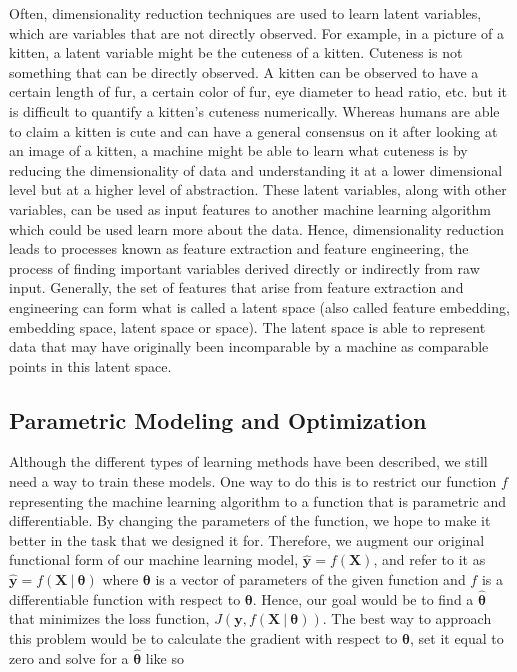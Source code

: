 Often, dimensionality reduction techniques are used to learn latent variables, which  are variables that are not directly observed. For example, in a picture of a kitten, a latent variable might be the cuteness of a kitten. Cuteness is not something that can be directly observed. A kitten can be observed to have a certain length of fur, a certain color of fur, eye diameter to head ratio, etc. but it is difficult to quantify a kitten's cuteness numerically. Whereas humans are able to claim a kitten is cute and can have a general consensus on it after looking at an image of a kitten, a machine might be able to learn what cuteness is by reducing the dimensionality of data and understanding it at a lower dimensional level but at a higher level of abstraction. These latent variables, along with other variables, can be used as input features to another machine learning algorithm which could be used learn more about the data. Hence, dimensionality reduction leads to processes known as feature extraction and feature engineering, the process of finding important variables derived directly or indirectly from raw input. Generally, the set of features that arise from feature extraction and engineering can form what is called a latent space (also called feature embedding, embedding space, latent space or space). The latent space is able to represent data that may have originally been incomparable by a machine as comparable points in this latent space. 
\subsection{Parametric Modeling and Optimization}
\label{paramsmodeling}

Although the different types of learning methods have been described, we still need a way to train these models. One way to do this is to restrict our function $f$ representing the machine learning algorithm to a function that is parametric and differentiable. By changing the parameters of the function, we hope to make it better in the task that we designed it for. Therefore, we augment our original functional form of our machine learning model, $\mathbf{\hat{y}} = f(\mathbf{X})$, and refer to it as $\mathbf{\hat{y}} = f(\mathbf{X} \ | \ \boldsymbol{\theta})$  where $\boldsymbol{\theta}$ is a vector of parameters of the given function and $f$ is a differentiable function with respect to $\boldsymbol{\theta}$. Hence, our goal would be to find a $\boldsymbol{\hat{\theta}}$ that minimizes the loss function, $J(\mathbf{y}, f(\mathbf{X} \ | \ \boldsymbol{\theta}))$. The best way to approach this problem would be to calculate the gradient with respect to $\boldsymbol{\theta}$, set it equal to zero and solve for a $\boldsymbol{\hat{\theta}}$ like so

